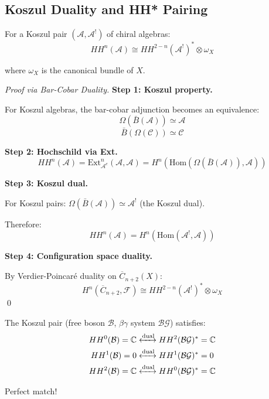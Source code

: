 \subsection{Koszul Duality and HH* Pairing}

\begin{theorem}\label{thm:koszul-duality-HH}
For a Koszul pair $(\mathcal{A}, \mathcal{A}^!)$ of chiral algebras:
$$HH^n(\mathcal{A}) \cong HH^{2-n}(\mathcal{A}^!)^* \otimes \omega_X$$

where $\omega_X$ is the canonical bundle of $X$.
\end{theorem}

\begin{proof}[Proof via Bar-Cobar Duality]
\textbf{Step 1: Koszul property.}

For Koszul algebras, the bar-cobar adjunction becomes an equivalence:
$$\Omega(\bar{B}(\mathcal{A})) \simeq \mathcal{A}$$
$$\bar{B}(\Omega(\mathcal{C})) \simeq \mathcal{C}$$

\textbf{Step 2: Hochschild via Ext.}
$$HH^n(\mathcal{A}) = \text{Ext}^n_{\mathcal{A}^e}(\mathcal{A}, \mathcal{A}) 
= H^n(\text{Hom}(\Omega(\bar{B}(\mathcal{A})), \mathcal{A}))$$

\textbf{Step 3: Koszul dual.}

For Koszul pairs: $\Omega(\bar{B}(\mathcal{A})) \simeq \mathcal{A}^!$ (the Koszul dual).

Therefore:
$$HH^n(\mathcal{A}) = H^n(\text{Hom}(\mathcal{A}^!, \mathcal{A}))$$

\textbf{Step 4: Configuration space duality.}

By Verdier-Poincaré duality on $\overline{C}_{n+2}(X)$:
$$H^n(\overline{C}_{n+2}, \mathcal{F}) \cong HH^{2-n}(\mathcal{A}^!)^* \otimes \omega_X$$
\qed
\end{proof}

\begin{verification}\label{ver:boson-fermion-HH}
The Koszul pair (free boson $\mathcal{B}$, $\beta\gamma$ system $\mathcal{BG}$) satisfies:
\begin{align*}
HH^0(\mathcal{B}) = \mathbb{C} &\xleftrightarrow{\text{dual}} HH^2(\mathcal{BG})^* = \mathbb{C}\\
HH^1(\mathcal{B}) = 0 &\xleftrightarrow{\text{dual}} HH^1(\mathcal{BG})^* = 0\\
HH^2(\mathcal{B}) = \mathbb{C} &\xleftrightarrow{\text{dual}} HH^0(\mathcal{BG})^* = \mathbb{C}
\end{align*}

Perfect match! \checkmark
\end{verification}

